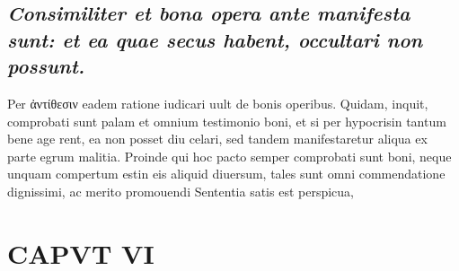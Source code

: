 \documentclass{article}
\begin{document}
\begin{pages}
\subsection*{\textit{Consimiliter et bona opera ante manifesta sunt: et ea quae secus habent, occultari non possunt. }}\pstart Per ἀντίθεσιν eadem ratione iudicari uult de bonis operibus. Quidam, inquit, comprobati sunt palam et omnium testimonio boni, et si per hypocrisin tantum bene age rent, ea non posset diu celari, sed tandem manifestaretur aliqua ex parte egrum malitia. Proinde qui hoc pacto semper comprobati sunt boni, neque unquam compertum estin eis aliquid diuersum, tales sunt omni commendatione dignissimi, ac merito promouendi Sententia satis est perspicua,  \pend
\endnumbering\beginnumbering\section{CAPVT VI}
{}

\end{pages}
\end{document}
